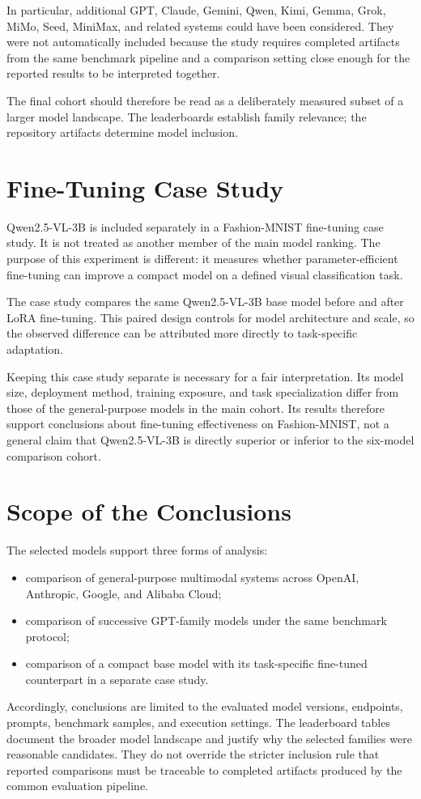\documentclass[11pt,a4paper]{report}
\begin{document}
In particular, additional GPT, Claude, Gemini, Qwen, Kimi, Gemma, Grok, MiMo,
Seed, MiniMax, and related systems could have been considered. They were not
automatically included because the study requires completed artifacts from the
same benchmark pipeline and a comparison setting close enough for the reported
results to be interpreted together.

The final cohort should therefore be read as a deliberately measured subset of
a larger model landscape. The leaderboards establish family relevance; the
repository artifacts determine model inclusion.

\section{Fine-Tuning Case Study}

Qwen2.5-VL-3B is included separately in a Fashion-MNIST fine-tuning case study.
It is not treated as another member of the main model ranking. The purpose of
this experiment is different: it measures whether parameter-efficient
fine-tuning can improve a compact model on a defined visual classification
task.

The case study compares the same Qwen2.5-VL-3B base model before and after LoRA
fine-tuning. This paired design controls for model architecture and scale, so
the observed difference can be attributed more directly to task-specific
adaptation.

Keeping this case study separate is necessary for a fair interpretation. Its
model size, deployment method, training exposure, and task specialization
differ from those of the general-purpose models in the main cohort. Its results
therefore support conclusions about fine-tuning effectiveness on Fashion-MNIST,
not a general claim that Qwen2.5-VL-3B is directly superior or inferior to the
six-model comparison cohort.

\section{Scope of the Conclusions}

The selected models support three forms of analysis:

\begin{itemize}
\item comparison of general-purpose multimodal systems across OpenAI,
Anthropic, Google, and Alibaba Cloud;
\item comparison of successive GPT-family models under the same benchmark
protocol;
\item comparison of a compact base model with its task-specific fine-tuned
counterpart in a separate case study.
\end{itemize}

Accordingly, conclusions are limited to the evaluated model versions,
endpoints, prompts, benchmark samples, and execution settings. The leaderboard
tables document the broader model landscape and justify why the selected
families were reasonable candidates. They do not override the stricter
inclusion rule that reported comparisons must be traceable to completed
artifacts produced by the common evaluation pipeline.
\end{document}
